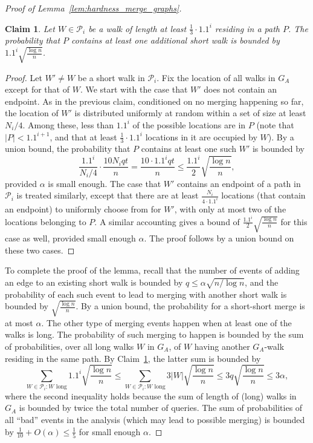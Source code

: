\documentclass[11pt]{article}
\numberwithin{equation}{section}
\newtheorem{claim}[claim]{Claim}
\renewcommand{\P}{\mathcal{P}}
\newcommand{\1}{\mathbf{1}}
\begin{document}
\begin{proof}[Proof of Lemma~\ref{lem:hardness_merge_graphs}]
\begin{claim}
\label{claim:long-short-merge}
Let $W \in \P_i$ be a walk of length at least $\frac{1}{3} \cdot 1.1^i$ residing in a path $P$. The probability that $P$ contains at least one additional short walk is bounded by $1.1^i \sqrt{\frac{\log n}{n}}$.
\end{claim}
\begin{proof}
Let $W' \neq W$ be a short walk in $\P_i$. Fix the location of all walks in $G_A$ except for that of $W$. We start with the case that $W'$ does not contain an endpoint.
As in the previous claim, conditioned on no merging happening so far, the location of $W'$ is distributed uniformly at random within a set of size at least $N_i / 4$. Among these, less than $1.1^i$ of the possible locations are in $P$ (note that $|P| < 1.1^{i+1}$, and that at least $\frac{1}{3} \cdot 1.1^i$ locations in it are occupied by $W$). By a union bound, the probability that $P$ contains at least one such $W'$ is bounded by
$$
\frac{1.1^i}{N_i/4} \cdot \frac{10 N_i q t}{n} = \frac{10 \cdot 1.1^i q t}{n} \leq \frac{1.1^i}{2} \sqrt{\frac{\log n}{n}},
$$
provided $\alpha$ is small enough. The case that $W'$ contains an endpoint of a path in $\P_i$ is treated similarly, except that there are at least $\frac{N_i} {4 \cdot 1.1^i}$ locations (that contain an endpoint) to uniformly choose from for $W'$, with only at most two of the locations belonging to $P$. A similar accounting gives a bound of $\frac{1.1^i}{2} \sqrt{\frac{\log n}{n}}$ for this case as well, provided small enough $\alpha$. The proof follows by a union bound on these two cases.
\end{proof}











To complete the proof of the lemma, recall that the number of events of adding an edge to an existing short walk is bounded by $q \leq \alpha \sqrt{n / \log n}$, and the probability of each such event to lead to merging with another short walk is bounded by $\sqrt{\frac{\log n}{n}}$. By a union bound, the probability for a short-short merge is at most $\alpha$. The other type of merging events happen when at least one of the walks is long. The probability of such merging to happen is bounded by the sum of probabilities, over all long walks $W$ in $G_A$, of $W$ having another $G_A$-walk residing in the same path. By Claim~\ref{claim:long-short-merge}, the latter sum is bounded by 
$$
\sum_{W \in \P_i : W \text{ long}} 1.1^i \sqrt{\frac{\log n}{n}} \leq \sum_{W \in \P_i : W \text{ long}} 3|W| \sqrt{\frac{\log n}{n}} \leq 3q \sqrt{\frac{\log n}{n}} \leq 3\alpha, 
$$
where the second inequality holds because the sum of length of (long) walks in $G_A$ is bounded by twice the total number of queries. The sum of probabilities of all ``bad'' events in the analysis (which may lead to possible merging) is bounded by $\frac{1}{10} + O(\alpha) \leq \frac{1}{5}$ for small enough $\alpha$.
\end{proof}
\end{document}
